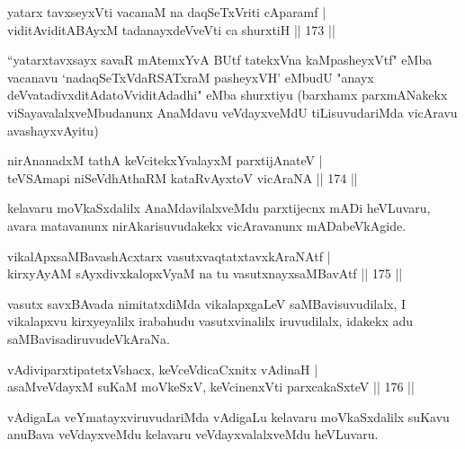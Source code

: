 \begin{shl}
yatarx tavxseyxVti vacanaM na daqSeTxVriti cAparamf |\\
viditAviditABAyxM tadanayxdeVveVti ca shurxtiH \hfill || 173 ||
\end{shl}

\begin{artha}
``yatarxtavxsayx savaR mAtemxYvA BUtf tatekxVna kaMpasheyxVtf" eMba vacanavu `nadaqSeTxVdaRSATxraM pasheyxVH' eMbudU "anayx deVvatadivxditAdatoV\s viditAdadhi" eMba shurxtiyu (barxhamx parxmANakekx viSayavalalxveMbudanunx AnaMdavu veVdayxveMdU tiLisuvudariMda vicAravu avashayxvAyitu)
\end{artha}

\begin{shl}
nirAnanadxM tathA keVcitekxYvalayxM parxtijAnateV |\\
teVSAmapi niSeVdhAthaRM kataRvAyx\s toV vicAraNA \hfill || 174 ||
\end{shl}

\begin{artha}
kelavaru moVkaSxdalilx AnaMdavilalxveMdu parxtijecnx mADi heVLuvaru, avara matavanunx nirAkarisuvudakekx vicAravanunx mADabeVkAgide.
\end{artha}


\begin{shl}
vikalApxsaMBavashAcxtarx vasutxvaqtatxtavxkAraNAtf |\\
kirxyAyAM sAyxdivxkalopxV\s yaM na tu vasutxnayxsaMBavAtf \hfill || 175 ||
\end{shl}

\begin{artha}%
vasutx savxBAvada nimitatxdiMda vikalapxgaLeV saMBavisuvudilalx, I vikalapxvu kirxyeyalilx irabahudu vasutxvinalilx iruvudilalx, idakekx adu saMBavisadiruvudeVkAraNa.
\end{artha}


\begin{shl}
vAdiviparxtipatetxVshacx, keVceVdicaCxnitx vAdinaH |\\
asaMveVdayxM suKaM moVkeSxV, keVcinenxVti parxcakaSxteV \hfill || 176 ||
\end{shl}

\begin{artha}
vAdigaLa veYmatayxviruvudariMda vAdigaLu kelavaru moVkaSxdalilx suKavu anuBava veVdayxveMdu kelavaru veVdayxvalalxveMdu heVLuvaru.
\end{artha}

